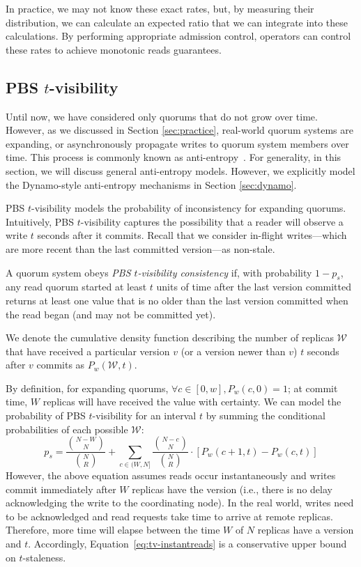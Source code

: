 \documentclass{vldb}
\begin{document}
In practice, we may not know these exact rates, but, by measuring
their distribution, we can calculate an expected ratio that we can
integrate into these calculations.  By performing appropriate
admission control, operators can control these rates to achieve
monotonic reads guarantees.

\subsection{PBS $t$-visibility}
\label{sec:tvis}

Until now, we have considered only quorums that do not grow over time.
However, as we discussed in Section \ref{sec:practice}, real-world quorum
systems are expanding, or asynchronously propagate writes to quorum system
members over time.  This process is commonly known as
anti-entropy~\cite{antientropy}.  For generality, in this section, we
will discuss general anti-entropy models. However, we explicitly model
the Dynamo-style anti-entropy mechanisms in Section \ref{sec:dynamo}.

PBS $t$-visibility models the probability of inconsistency for
expanding quorums.  Intuitively, PBS $t$-visibility captures the
possibility that a reader will observe a write $t$ seconds after it
commits.  Recall that we consider in-flight writes---which are more
recent than the last committed version---as non-stale.

\begin{definition}
A quorum system obeys \textit{PBS $t$-visibility consistency} if, with
probability $1-p_{s}$, any read quorum started at least $t$ units
of time after the last version committed returns at least one value
that is no older than the last version committed when the read
began (and may not be committed yet).
\end{definition}

We denote the cumulative density function describing the number of
replicas $\mathcal{W}$ that have received a particular version $v$ (or
a version newer than $v$) $t$ seconds after $v$ commits as
$P_w(\mathcal{W}, t)$.

By definition, for expanding quorums, $\forall c \in [0, w], P_w(c,0)
= 1$; at commit time, $W$ replicas will have received the value with
certainty.  We can model the probability of PBS $t$-visibility for an
interval $t$ by summing the conditional probabilities of each possible
$\mathcal{W}$:
\begin{equation}
\label{eq:tv-instantreads}
p_{s} = \frac{{N-W \choose N}}{{N \choose R}}+\sum_{c\in(W, N]} \frac{{N-c \choose N}}{{N \choose R}}\cdot [P_w(c+1, t)-P_w(c,t)]
\end{equation}
However, the above equation assumes reads occur instantaneously and
writes commit immediately after $W$ replicas have the version (i.e.,
there is no delay acknowledging the write to the coordinating node).
In the real world, writes need to be acknowledged and read requests
take time to arrive at remote replicas.  Therefore, more time will elapse
between the time $W$ of $N$ replicas have a version and $t$.
Accordingly, Equation~\ref{eq:tv-instantreads} is a conservative upper
bound on $t$-staleness.
\end{document}
